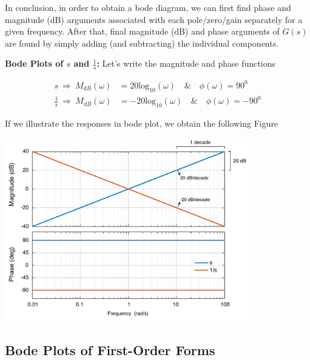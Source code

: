 \documentclass[twoside]{article}
\begin{document}
In conclusion, in order to obtain a bode diagram, we can 
first find phase and magnitude (dB) arguments associated 
with each pole/zero/gain separately for a given frequency.
After that, final magnitude (dB) and phase arguments of $G(s)$
are found by simply adding (and subtracting) the individual components.

\newpage

\textbf{Bode Plots of $s$ and $\frac{1}{s}$:} Let's write the
magnitude and phase functions 

\begin{align*}
s \ \Rightarrow \  M_{dB}(\omega) &= 20 \mathrm{log}_{10} ( \omega ) \quad \& \quad \phi (\omega) = 90^0 
                                                        \\
\frac{1}{s} \ \Rightarrow \ M_{dB} ( \omega ) &= - 20 \mathrm{log}_{10} ( \omega ) \quad \& \quad \phi (\omega) = -90^0 
\end{align*}

If we illustrate the responses in bode plot, we obtain the following Figure

\vspace{6 pt}

  \begin{minipage}[h]{1\linewidth}
    \begin{center}
      \includegraphics[width=0.8\textwidth]{bode_DandI}
    \end{center}
  \end{minipage}

\vspace{6pt}

\subsection*{Bode Plots of First-Order Forms}
\end{document}
